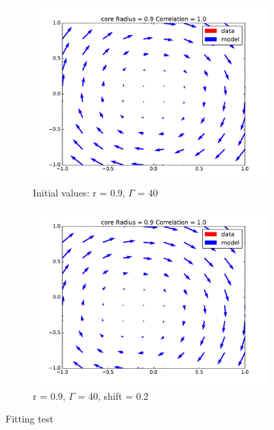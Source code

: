 \documentclass[12pt, a4paper, openany]{memoir}
\begin{document}
\begin{figure}[h!]
\begin{subfigure}[b]{0.45\textwidth}
		\includegraphics[trim=40 20 40 20 ,clip, width=\textwidth]{figure/test_09_40.pdf}
		\caption{Initial values: r = 0.9, $\Gamma$ = 40}
	\end{subfigure}
	\begin{subfigure}[b]{0.45\textwidth}
		\centering
		\includegraphics[trim=40 20 40 20 ,clip, width=\textwidth]{figure/test_09_40_02.pdf}
		\caption{r = 0.9, $\Gamma$ = 40, shift = 0.2}
	\end{subfigure}
	\caption{Fitting test}
	\label{fig:fittingtests}
\end{figure}
\end{document}
